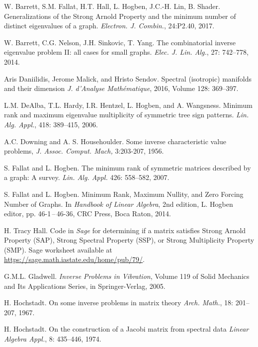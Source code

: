 \documentclass[11pt]{article}
\theoremstyle{definition}
\theoremstyle{definition}
\theoremstyle{definition}
\begin{document}
\begin{thebibliography}{1}
 W. Barrett, S.M. Fallat, H.T. Hall,  L.
Hogben, J.C.-H. Lin, B.  Shader.  Generalizations of the Strong Arnold Property and  the minimum number of distinct eigenvalues of  a graph.  {\em Electron. J. Combin.}, 24:P2.40, 2017. 


 W. Barrett, C.G. Nelson, J.H. Sinkovic, T. Yang. The combinatorial inverse eigenvalue problem II:
all cases for small graphs. {\em Elec. J.  Lin. Alg.},  27: 742--778, 2014.

Aris Daniilidis, Jerome Malick, and Hristo Sendov.
Spectral (isotropic) manifolds and their dimension
{\it J. d'Analyse Math\'ematique}, 
2016, Volume 128: 369--397.

 L.M. DeAlba, T.L.  Hardy, I.R. Hentzel, L. Hogben, 
and A. Wangsness. Minimum rank and maximum eigenvalue multiplicity of 
symmetric tree sign patterns. {\em Lin. Alg. Appl.}, 
418: 389--415, 2006.

A.C. Downing and A. S. Househoulder. Some inverse characteristic
value problems, {\em J. Assoc. Comput. Mach,} 3:203-207, 1956.

	S. Fallat and L. Hogben.
The minimum rank of symmetric matrices described by a graph: A survey.   
{\em Lin. Alg. Appl.} 426: 558--582, 2007.  


	S. Fallat and L. Hogben. Minimum Rank, Maximum Nullity, and Zero Forcing Number of Graphs.  In \emph{Handbook of Linear Algebra},  2nd edition, L. Hogben editor, pp. 46-1\,--\,46-36, CRC Press, Boca Raton, 2014. 


	H. Tracy Hall.
Code in {\em Sage}  for determining if a matrix satisfies Strong Arnold Property (SAP),   Strong Spectral Property (SSP), or  Strong Multiplicity Property (SMP).    Sage worksheet available at \url{https://sage.math.iastate.edu/home/pub/79/}.  

 G.M.L. Gladwell. {\it Inverse Problems in Vibration}, Volume 119 of  Solid Mechanics and Its Applications Series, 
in Springer-Verlag, 2005.

H. Hochstadt.
On some inverse problems in matrix theory
{\em Arch. Math.}, 18: 201--207, 1967.

H. Hochstadt.
On the construction of a Jacobi matrix from spectral data
{\em Linear Algebra Appl.}, 8: 435--446, 1974.


\end{thebibliography}
\end{document}
